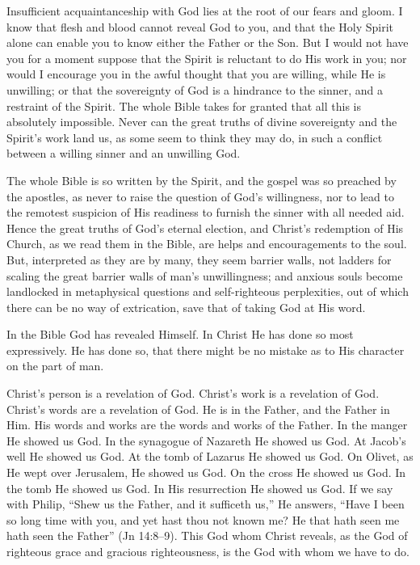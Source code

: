 \documentclass[
]{book}
\begin{document}
Insufficient acquaintanceship with God lies at the root of our fears and gloom. I know that flesh and blood cannot reveal God to you, and that the Holy Spirit alone can enable you to know either the Father or the Son. But I would not have you for a moment suppose that the Spirit is reluctant to do His work in you; nor would I encourage you in the awful thought that you are willing, while He is unwilling; or that the sovereignty of God is a hindrance to the sinner, and a restraint of the Spirit. The whole Bible takes for granted that all this is absolutely impossible. Never can the great truths of divine sovereignty and the Spirit's work land us, as some seem to think they may do, in such a conflict between a willing sinner and an unwilling God.

The whole Bible is so written by the Spirit, and the gospel was so preached by the apostles, as never to raise the question of God's willingness, nor to lead to the remotest suspicion of His readiness to furnish the sinner with all needed aid. Hence the great truths of God's eternal election, and Christ's redemption of His Church, as we read them in the Bible, are helps and encouragements to the soul. But, interpreted as they are by many, they seem barrier walls, not ladders for scaling the great barrier walls of man's unwillingness; and anxious souls become landlocked in metaphysical questions and self-righteous perplexities, out of which there can be no way of extrication, save that of taking God at His word.

In the Bible God has revealed Himself. In Christ He has done so most expressively. He has done so, that there might be no mistake as to His character on the part of man.

Christ's person is a revelation of God. Christ's work is a revelation of God. Christ's words are a revelation of God. He is in the Father, and the Father in Him. His words and works are the words and works of the Father. In the manger He showed us God. In the synagogue of Nazareth He showed us God. At Jacob's well He showed us God. At the tomb of Lazarus He showed us God. On Olivet, as He wept over Jerusalem, He showed us God. On the cross He showed us God. In the tomb He showed us God. In His resurrection He showed us God. If we say with Philip, ``Shew us the Father, and it sufficeth us,'' He answers, ``Have I been so long time with you, and yet hast thou not known me? He that hath seen me hath seen the Father'' (Jn 14:8--9). This God whom Christ reveals, as the God of righteous grace and gracious righteousness, is the God with whom we have to do.
\end{document}
